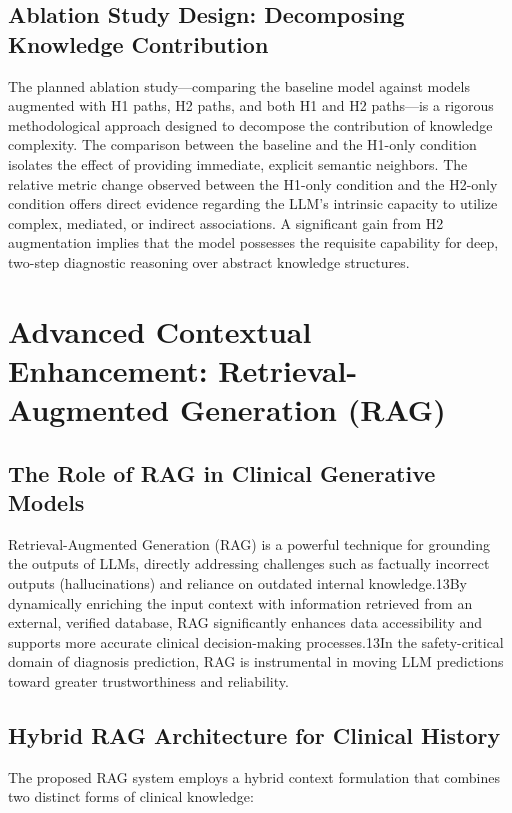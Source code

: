 \subsection{Ablation Study Design: Decomposing Knowledge Contribution}
The planned ablation study—comparing the baseline model against models augmented with H1 paths, H2 paths, and both H1 and H2 paths—is a rigorous methodological approach designed to decompose the contribution of knowledge complexity.
The comparison between the baseline and the H1-only condition isolates the effect of providing immediate, explicit semantic neighbors.
The relative metric change observed between the H1-only condition and the H2-only condition offers direct evidence regarding the LLM's intrinsic capacity to utilize complex, mediated, or indirect associations. A significant gain from H2 augmentation implies that the model possesses the requisite capability for deep, two-step diagnostic reasoning over abstract knowledge structures.

\section*{Advanced Contextual Enhancement: Retrieval-Augmented Generation (RAG)}
\subsection{The Role of RAG in Clinical Generative Models}
Retrieval-Augmented Generation (RAG) is a powerful technique for grounding the outputs of LLMs, directly addressing challenges such as factually incorrect outputs (hallucinations) and reliance on outdated internal knowledge.13By dynamically enriching the input context with information retrieved from an external, verified database, RAG significantly enhances data accessibility and supports more accurate clinical decision-making processes.13In the safety-critical domain of diagnosis prediction, RAG is instrumental in moving LLM predictions toward greater trustworthiness and reliability.

\subsection{Hybrid RAG Architecture for Clinical History}
The proposed RAG system employs a hybrid context formulation that combines two distinct forms of clinical knowledge:

